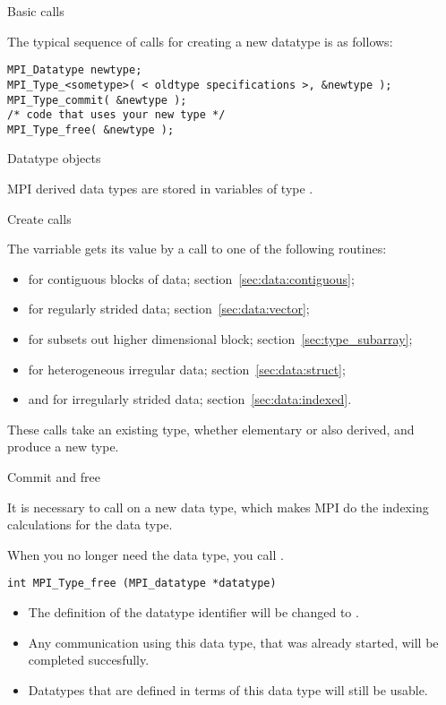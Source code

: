  {Basic calls}
\label{sec:data-commit}

The typical sequence of calls for creating a new datatype is as follows:
\begin{verbatim}
MPI_Datatype newtype;
MPI_Type_<sometype>( < oldtype specifications >, &newtype );
MPI_Type_commit( &newtype );
/* code that uses your new type */
MPI_Type_free( &newtype );
\end{verbatim}

 {Datatype objects}

MPI derived data types are stored in variables of type
.
%

 {Create calls}

The  varriable gets its value by a call to
one of the following routines:
\begin{itemize}
\item {} for contiguous blocks of
  data; section~\ref{sec:data:contiguous};
\item {} for regularly strided data;
  section~\ref{sec:data:vector};
\item {} for subsets out higher
  dimensional block; section~\ref{sec:type_subarray};
\item {} for heterogeneous irregular data;
  section~\ref{sec:data:struct};
\item {} and
   for irregularly strided data;
  section~\ref{sec:data:indexed}.
\end{itemize}
These calls take an existing type, whether elementary or also derived,
and produce a new type.

 {Commit and free}

It is necessary to call  on a new data
type, which makes MPI do the indexing calculations for the data type.
%

When you no longer
need the data type, you call .
\begin{verbatim}
int MPI_Type_free (MPI_datatype *datatype)
\end{verbatim}
\begin{itemize}
\item The definition of the datatype identifier will be changed to
  .
\item Any communication using this data type, that was already
  started, will be completed succesfully.
\item Datatypes that are defined in terms of this data type will still
  be usable.
\end{itemize}

